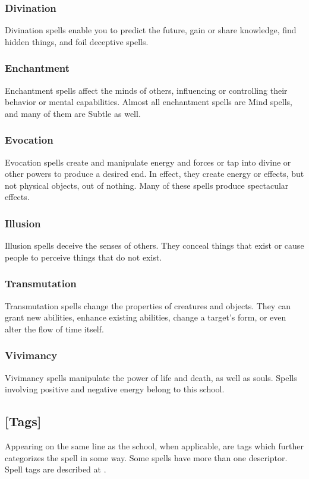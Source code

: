 \subsubsection{Divination}
Divination spells enable you to predict the future, gain or share knowledge, find hidden things, and foil deceptive spells.

\subsubsection{Enchantment}
Enchantment spells affect the minds of others, influencing or controlling their behavior or mental capabilities. Almost all enchantment spells are Mind spells, and many of them are Subtle as well.

\subsubsection{Evocation}
Evocation spells create and manipulate energy and forces or tap into divine or other powers to produce a desired end. In effect, they create energy or effects, but not physical objects, out of nothing. Many of these spells produce spectacular effects.

\subsubsection{Illusion}
Illusion spells deceive the senses of others. They conceal things that exist or cause people to perceive things that do not exist.

\subsubsection{Transmutation}
Transmutation spells change the properties of creatures and objects. They can grant new abilities, enhance existing abilities, change a target's form, or even alter the flow of time itself.

\subsubsection{Vivimancy}
Vivimancy spells manipulate the power of life and death, as well as souls. Spells involving positive and negative energy belong to this school.

\subsection{[Tags]}
Appearing on the same line as the school, when applicable, are tags which further categorizes the spell in some way. Some spells have more than one descriptor. Spell tags are described at .

